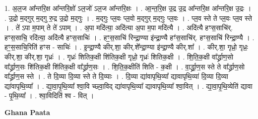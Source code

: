 \documentclass[17pt]{extarticle}
\begin{document}
1. अ॒ल॒ज आ᳚न्तरि॒क्ष आ᳚न्तरि॒क्षो॑ ऽल॒जो॑ ऽल॒ज आ᳚न्तरि॒क्षः । . आ॒न्त॒रि॒क्ष उ॒द्र उ॒द्र आ᳚न्तरि॒क्ष आ᳚न्तरि॒क्ष उ॒द्रः । . उ॒द्रो म॒द्‌गुर् म॒द्‌गु रु॒द्र उ॒द्रो म॒द्‌गुः । . म॒द्‌गुः प्ल॒वः प्ल॒वो म॒द्‌गुर् म॒द्‌गुः प्ल॒वः । . प्ल॒व स्ते ते प्ल॒वः प्ल॒व स्ते । . ते॑ ऽपा म॒पाम् ते ते॑ ऽपाम् । . अ॒पा मदि॑त्या॒ अदि॑त्या अ॒पा म॒पा मदि॑त्यै । . अदि॑त्यै हꣳस॒साचि॑र्. हꣳस॒साचि॒ रदि॑त्या॒ अदि॑त्यै हꣳस॒साचिः॑ । . हꣳ॒॒स॒साचि॑ रिन्द्रा॒ण्या इ॑न्द्रा॒ण्यै हꣳ॑स॒साचि॑र्. हꣳस॒साचि॑ रिन्द्रा॒ण्यै । . हꣳ॒॒स॒साचि॒रिति॑ हꣳस - साचिः॑ । . इ॒न्द्रा॒ण्यै कीर्.शा॒ कीर्.शे᳚न्द्रा॒ण्या इ॑न्द्रा॒ण्यै कीर्.शा᳚ । . कीर्.शा॒ गृध्रो॒ गृध्रः॒ कीर्.शा॒ कीर्.शा॒ गृध्रः॑ । . गृध्रः॑ शितिक॒क्षी शि॑तिक॒क्षी गृध्रो॒ गृध्रः॑ शितिक॒क्षी । . शि॒ति॒क॒क्षी वा᳚र्द्ध्राण॒सो वा᳚र्द्ध्राण॒सः शि॑तिक॒क्षी शि॑तिक॒क्षी वा᳚र्द्ध्राण॒सः । . शि॒ति॒क॒क्षीति॑ शिति - क॒क्षी । . वा॒र्द्ध्रा॒ण॒स स्ते ते वा᳚र्द्ध्राण॒सो वा᳚र्द्ध्राण॒स स्ते । . ते दि॒व्या दि॒व्या स्ते ते दि॒व्याः । . दि॒व्या द्या॑वापृथि॒व्या᳚ द्यावापृथि॒व्या॑ दि॒व्या दि॒व्या द्या॑वापृथि॒व्या᳚ । . द्या॒वा॒पृ॒थि॒व्या᳚ श्वा॒वि च्छ्वा॒विद् द्या॑वापृथि॒व्या᳚ द्यावापृथि॒व्या᳚ श्वा॒वित् । . द्या॒वा॒पृ॒थि॒व्येति॑ द्यावा - पृ॒थि॒व्या᳚ । . श्वा॒विदिति॑ श्व - वित् । \newline

\textbf{Ghana Paata } \newline
\end{document}
